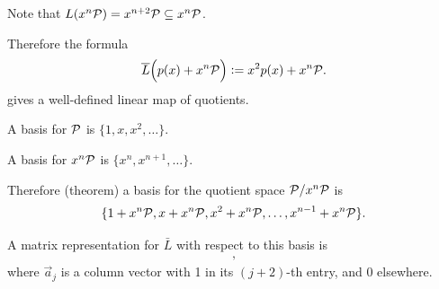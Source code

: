 
Note that $L(x^n\mathcal P) = x^{n+2}\mathcal P \subseteq x^n\mathcal P$.

Therefore the formula
\begin{align*}
  \overline L\Big(p(x) + x^n\mathcal P\Big) := x^2p(x) + x^n\mathcal P.
\end{align*}
gives a well-defined linear map of quotients.

A basis for $\mathcal P$ is $\{1, x, x^2, \ldots\}$.

A basis for $x^n\mathcal P$ is $\{x^n, x^{n+1}, \ldots\}$.

Therefore (theorem) a basis for the quotient space $\mathcal P/x^n\mathcal P$ is
\begin{align*}
  \{1 + x^n\mathcal P, x + x^n\mathcal P, x^2 + x^n\mathcal P, \ldots, x^{n-1} + x^n\mathcal P\}.
\end{align*}

A matrix representation for $\bar L$ with respect to this basis is
\begin{align*}
  [\vec a_1, \vec a_2, \ldots, \vec a_{n-1}],
\end{align*}
where $\vec a_{j}$ is a column vector with 1 in its $(j + 2)$-th entry, and 0 elsewhere.

